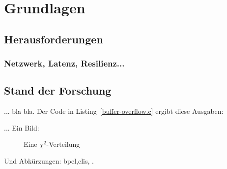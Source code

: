 \section{Grundlagen}



\subsection{Herausforderungen}
\subsubsection{Netzwerk, Latenz, Resilienz...}

\subsection{Stand der Forschung}

... bla bla. Der Code in Listing~\ref{buffer-overflow.c} ergibt diese Ausgaben:


... Ein Bild:

\begin{figure}[h]
    \caption{Eine $\chi^2$-Verteilung}\label{img-sample}
\end{figure}

Und Abkürzungen: \gls{bpel},\glspl{cli}, .